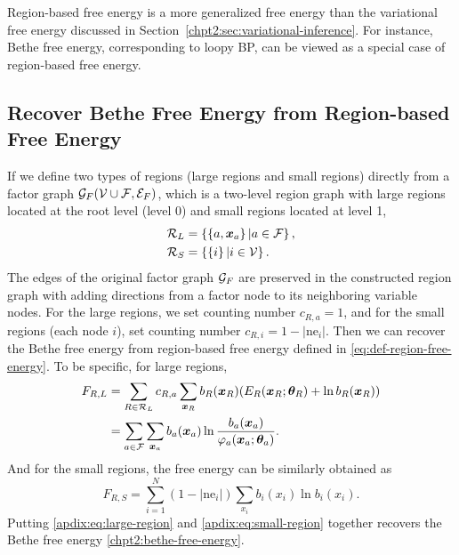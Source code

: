 Region-based free energy is a more generalized free energy than the variational free energy discussed in Section~\ref{chpt2:sec:variational-inference}. For instance, Bethe free energy, corresponding to loopy BP, can be viewed as a special case of region-based free energy.

\subsection{Recover Bethe Free Energy from Region-based Free Energy}
\label{apdix:sec:get-bethe-from-region-energy}
If we define two types of regions (large regions and small
regions) directly from a factor graph $\mathcal{G}_F(\mathcal{V} \cup \mathcal{F}, \mathcal{E}_F)$, which is a two-level region graph with large regions located at the root level (level 0) and small regions located at level 1, 
\begin{align}
  \mathcal{R}_{L} &= \left\{ \left\{ a, \bm{x}_a \right\}| a\in \mathcal{F} \right\}, \nonumber \\
  \mathcal{R}_{S} &= \left\{ \left\{ i \right\} | i \in \mathcal{V} \right\}.
\end{align}
The edges of the original factor graph $\mathcal{G}_F$ are preserved in the constructed region graph with adding directions from a factor node to its neighboring variable nodes. For the large regions, we set counting number $c_{R,a}=1$, and for the small regions (each node $i$), set counting number $c_{R,i}=1-|\mathrm{ne}_i|$. Then we can recover the Bethe free energy from region-based free energy defined in 
\eqref{eq:def-region-free-energy}. To be specific, for
large regions,
\begin{align}\label{apdix:eq:large-region}
  F_{R,L} &=\sum_{R\in \mathcal{R}_{L}} c_{R,a}
            \sum_{\bm{x}_R}b_R(\bm{x}_R) (E_R(\bm{x}_R;\bm{\theta}_R) + \ln{b_R}(\bm{x}_R))
            \nonumber \\
          & =\sum_{a\in \mathcal{F}} \sum_{\bm{x}_a} b_a(\bm{x}_a)\ln{\frac{b_a(\bm{x}_a)}{\varphi_a(\bm{x}_a; \bm{\theta}_a)}}.
\end{align}
And for the small regions, the free energy can be similarly obtained as
\begin{equation}\label{apdix:eq:small-region}
  F_{R,S}  =  \sum_{i=1}^{N} (1- |\mathrm{ne}_i|) \sum_{x_i} b_i(x_i) \ln{b_i(x_i)}.
\end{equation}
Putting \eqref{apdix:eq:large-region} and \eqref{apdix:eq:small-region} together recovers the Bethe free energy \eqref{chpt2:bethe-free-energy}.






